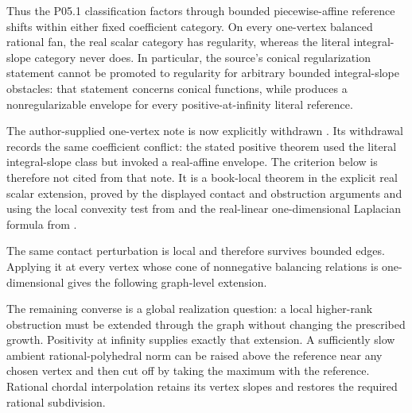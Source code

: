 


Thus the P05.1 classification factors through bounded piecewise-affine
reference shifts within either fixed coefficient category.  On every
one-vertex balanced rational fan, the real scalar category has regularity,
whereas the literal integral-slope category never does.  In particular, the
source's conical regularization statement cannot be promoted to regularity
for arbitrary bounded integral-slope obstacles: that statement concerns
conical functions, while
 produces a
nonregularizable envelope for every positive-at-infinity literal reference.

The author-supplied one-vertex note is now explicitly withdrawn
\cite{SuppliedP05220260925}.  Its withdrawal records the same coefficient
conflict: the stated positive theorem used the literal integral-slope class
but invoked a real-affine envelope.  The criterion below is therefore not
cited from that note.  It is a book-local theorem in the explicit real
scalar extension, proved by the displayed contact and obstruction arguments
and using the local convexity test from
\cite[Definitions~3.2--3.3]{BMPS26} and the real-linear one-dimensional
Laplacian formula from
\cite[Definition~6.15 and Proposition~6.17]{BMPS26}.




The same contact perturbation is local and therefore survives bounded
edges.  Applying it at every vertex whose cone of nonnegative balancing
relations is one-dimensional gives the following graph-level extension.




The remaining converse is a global realization question: a local
higher-rank obstruction must be extended through the graph without changing
the prescribed growth.  Positivity at infinity supplies exactly that
extension.  A sufficiently slow ambient rational-polyhedral norm can be
raised above the reference near any chosen vertex and then cut off by taking
the maximum with the reference.  Rational chordal interpolation retains its
vertex slopes and restores the required rational subdivision.

